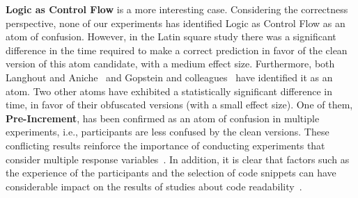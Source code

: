 \textbf{Logic as Control Flow} is a more interesting case. Considering the correctness perspective, none of our experiments has identified Logic as Control Flow as an atom of confusion. However, in the Latin square study there was a significant difference in the time required to make a correct prediction in favor of the clean version of this atom candidate, with a medium effect size. Furthermore, both Langhout and Aniche~\cite{Langhout:2021:ACJ} and Gopstein and colleagues~\cite{DBLP:conf/sigsoft/GopsteinIYDZYC17} have identified it as an atom. Two other atoms have exhibited a statistically significant difference in time, in favor of their obfuscated versions (with a small effect size). One of them, \textbf{Pre-Increment}, has been confirmed as an atom of confusion in multiple experiments, i.e., participants are less confused by the clean versions. These conflicting results reinforce the importance of conducting experiments that consider multiple response variables~\cite{Oliveira:2020:ECR}. In addition, it is clear that factors such as the experience of the participants and the selection of code snippets can have considerable impact on the results of studies about code readability~\cite{Feitelson:2021:CPC}. 

